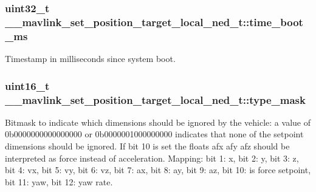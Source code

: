 \hypertarget{struct____mavlink__set__position__target__local__ned__t_a43e26d49abe450f838ed70d09a8588fc}{
\subsubsection[{time\+\_\+boot\+\_\+ms}]{\setlength{\rightskip}{0pt plus 5cm}uint32\+\_\+t \+\_\+\+\_\+mavlink\+\_\+set\+\_\+position\+\_\+target\+\_\+local\+\_\+ned\+\_\+t\+::time\+\_\+boot\+\_\+ms}}\label{struct____mavlink__set__position__target__local__ned__t_a43e26d49abe450f838ed70d09a8588fc}


Timestamp in milliseconds since system boot. 

\hypertarget{struct____mavlink__set__position__target__local__ned__t_a7aef320f429808ebbc6df07ffe12b426}{
\subsubsection[{type\+\_\+mask}]{\setlength{\rightskip}{0pt plus 5cm}uint16\+\_\+t \+\_\+\+\_\+mavlink\+\_\+set\+\_\+position\+\_\+target\+\_\+local\+\_\+ned\+\_\+t\+::type\+\_\+mask}}\label{struct____mavlink__set__position__target__local__ned__t_a7aef320f429808ebbc6df07ffe12b426}


Bitmask to indicate which dimensions should be ignored by the vehicle\+: a value of 0b0000000000000000 or 0b0000001000000000 indicates that none of the setpoint dimensions should be ignored. If bit 10 is set the floats afx afy afz should be interpreted as force instead of acceleration. Mapping\+: bit 1\+: x, bit 2\+: y, bit 3\+: z, bit 4\+: vx, bit 5\+: vy, bit 6\+: vz, bit 7\+: ax, bit 8\+: ay, bit 9\+: az, bit 10\+: is force setpoint, bit 11\+: yaw, bit 12\+: yaw rate. 

